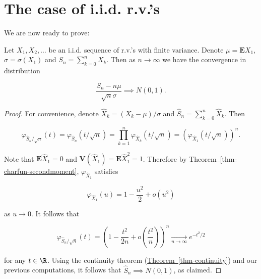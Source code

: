 \section{The case of i.i.d. r.v.’s}

We are now ready to prove:

\begin{thm}
Let $X_1, X_2, \ldots$ be an i.i.d. sequence of
r.v.'s with finite variance. Denote
$\mu = \mathbf{E} X_1$, $\sigma = \sigma(X_1)$ and
$S_n = \sum_{k=0}^n X_k$. Then as $n\to\infty$ we
have the convergence in distribution

\[
\frac{S_n-n\mu}{\sqrt{n}\sigma} \implies N(0,1).
\]

\end{thm}

\begin{proof}
For convenience, denote
$\hat{X}_k = (X_k - \mu)/\sigma$ and
$\hat{S}_n = \sum_{k=0}^n \hat{X}_k$. Then

\[
\varphi_{\hat{S}_n/\sqrt{n}}(t) = \varphi_{\hat{S}_n}(t/\sqrt{n})
= \prod_{k=1}^n \varphi_{\hat{X}_k}(t/\sqrt{n}) = \left(\varphi_{\hat{X}_1}(t/\sqrt{n})\right)^n.
\]

\noindent Note that $\mathbf{E} \hat{X}_1 = 0$ and
$\mathbf{V}(\hat{X}_1)=\mathbf{E} \hat{X}_1^2 = 1$.
Therefore by \hyperref[thm-charfun-secondmoment]{Theorem~\ref*{thm-charfun-secondmoment}},
$\varphi_{\hat{X}_1}$ satisfies

\[
\varphi_{\hat{X}_1}(u) = 1 - \frac{u^2}{2} + o(u^2)
\]

\noindent as $u\to0$. It follows that

\[
\varphi_{\hat{S}_n/\sqrt{n}}(t) = \left(1 - \frac{t^2}{2n} + o\left(\frac{t^2}{n}\right) \right)^n \xrightarrow[n\to\infty]{} e^{-t^2/2}
\]

\noindent for any $t\in\R$. Using the continuity theorem
(\hyperref[thm-continuity]{Theorem~\ref*{thm-continuity}}) and our previous
computations, it follows that
$\hat{S}_n \implies N(0,1)$, as claimed.
\end{proof}
